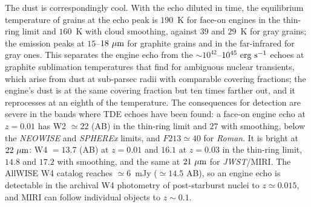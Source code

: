 \documentclass[twocolumn,pdftex]{aastex701}
\newcommand{\um}{\mu{\rm m}\xspace}
\newcommand{\neowise}{{\it NEOWISE}\xspace}
\newcommand{\jwst}{{\it JWST}\xspace}
\newcommand{\romantel}{{\it Roman}\xspace}
\newcommand{\spherex}{{\it SPHEREx}\xspace}
\begin{document}
The dust is correspondingly cool. With the echo diluted in time, the equilibrium temperature of \citet{Barvainis:1987a} grains at the echo peak is $190$~K for face-on engines in the thin-ring limit and $160$~K with cloud smoothing, against $39$ and $29$~K for gray grains; the emission peaks at $15$--$18~\um$ for graphite grains and in the far-infrared for gray ones. This separates the engine echo from the $\sim 10^{42}$--$10^{45}~{\rm erg~s^{-1}}$ echoes at graphite sublimation temperatures that \citet{Hinkle:2024b} find for ambiguous nuclear transients, which arise from dust at sub-parsec radii with comparable covering fractions; the engine's dust is at the same covering fraction but ten times farther out, and it reprocesses at an eighth of the temperature. The consequences for detection are severe in the bands where TDE echoes have been found: a face-on engine echo at $z = 0.01$ has W2 $\simeq 22$ (AB) in the thin-ring limit and $27$ with smoothing, below the \neowise and \spherex limits, and $F213 \simeq 40$ for \romantel. It is bright at $22~\um$: W4 $= 13.7$ (AB) at $z = 0.01$ and $16.1$ at $z = 0.03$ in the thin-ring limit, $14.8$ and $17.2$ with smoothing, and the same at $21~\um$ for \jwst/MIRI. The AllWISE W4 catalog reaches $\simeq 6$~mJy ($\simeq 14.5$ AB), so an engine echo is detectable in the archival W4 photometry of post-starburst nuclei to $z \simeq 0.015$, and MIRI can follow individual objects to $z \sim 0.1$.
\end{document}
